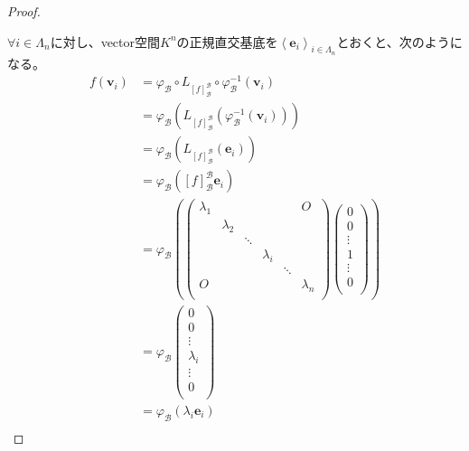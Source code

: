 \documentclass[dvipdfmx]{jsarticle}
\begin{document}
\begin{proof}
\begin{center}
\begin{tikzpicture}[auto]
  \end{tikzpicture} 
\end{center}
$\forall i \in \varLambda_{n}$に対し、vector空間$K^{n}$の正規直交基底を$\left\langle \mathbf{e}_{i} \right\rangle_{i \in \varLambda_{n}}$とおくと、次のようになる。
\begin{align*}
f\left( \mathbf{v}_{i} \right) &= \varphi_{\mathcal{B}} \circ L_{[ f]_{\mathcal{B}}^{\mathcal{B}}} \circ \varphi_{\mathcal{B}}^{- 1}\left( \mathbf{v}_{i} \right)\\
&= \varphi_{\mathcal{B}}\left( L_{[ f]_{\mathcal{B}}^{\mathcal{B}}}\left( \varphi_{\mathcal{B}}^{- 1}\left( \mathbf{v}_{i} \right) \right) \right)\\
&= \varphi_{\mathcal{B}}\left( L_{[ f]_{\mathcal{B}}^{\mathcal{B}}}\left( \mathbf{e}_{i} \right) \right)\\
&= \varphi_{\mathcal{B}}\left( [ f]_{\mathcal{B}}^{\mathcal{B}}\mathbf{e}_{i} \right)\\
&= \varphi_{\mathcal{B}}\left( \begin{pmatrix}
\lambda_{1} & \  & \  & \  & \  & O \\
\  & \lambda_{2} & \  & \  & \  & \  \\
\  & \  & \ddots & \  & \  & \  \\
\  & \  & \  & \lambda_{i} & \  & \  \\
\  & \  & \  & \  & \ddots & \  \\
O & \  & \  & \  & \  & \lambda_{n} \\
\end{pmatrix}\begin{pmatrix}
0 \\
0 \\
 \vdots \\
1 \\
 \vdots \\
0 \\
\end{pmatrix} \right)\\
&= \varphi_{\mathcal{B}}\begin{pmatrix}
0 \\
0 \\
 \vdots \\
\lambda_{i} \\
 \vdots \\
0 \\
\end{pmatrix}\\
&= \varphi_{\mathcal{B}}\left( \lambda_{i}\mathbf{e}_{i} \right)\\

\end{align*}
\end{proof}
\end{document}
